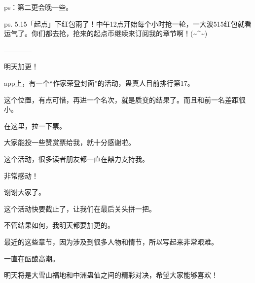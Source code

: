 \begin{this_body}
ps：第二更会晚一些。

ps. 5.15「起点」下红包雨了！中午12点开始每个小时抢一轮，一大波515红包就看运气了。你们都去抢，抢来的起点币继续来订阅我的章节啊！(\~{}\^{}\~{})

------------

明天加更！

app上，有一个“作家荣登封面”的活动，蛊真人目前排行第17。

这个位置，有点可惜，再进一个名次，就是质变的结果了。而且和前一名差距很小。

在这里，拉一下票。

大家能投一些赞赏票给我，就十分感谢啦。

这个活动，很多读者朋友都一直在鼎力支持我。

非常感动！

谢谢大家了。

这个活动快要截止了，让我们在最后关头拼一把。

不管结果如何，我明天都要加更的。

最近的这些章节，因为涉及到很多人物和情节，所以写起来非常艰难。

一直在酝酿高潮。

明天将是大雪山福地和中洲蛊仙之间的精彩对决，希望大家能够喜欢！

\end{this_body}

